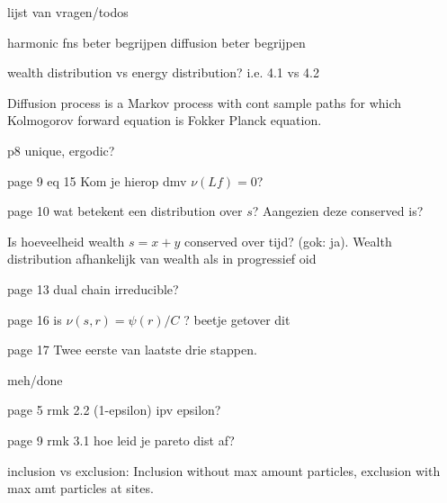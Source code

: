 lijst van vragen/todos

harmonic fns beter begrijpen
diffusion beter begrijpen

wealth distribution vs energy distribution? i.e. 4.1 vs 4.2

Diffusion process is a Markov process with cont sample paths for which Kolmogorov forward equation is Fokker Planck equation.



p8 unique, ergodic?


page 9 eq 15
Kom je hierop dmv $\nu(Lf) = 0$?

page 10
wat betekent een distribution over $s$? Aangezien deze conserved is?

Is hoeveelheid wealth $s=x+y$ conserved over tijd? (gok: ja). Wealth distribution afhankelijk van wealth als in progressief oid

page 13 dual chain irreducible?


page 16 is $\nu(s, r) = \psi(r)/C$ ? beetje getover dit

page 17 Twee eerste van laatste drie stappen.


meh/done

page 5 rmk 2.2 (1-epsilon) ipv epsilon?

page 9 rmk 3.1 hoe leid je pareto dist af?





inclusion vs exclusion: Inclusion without max amount particles, exclusion with max amt particles at sites.